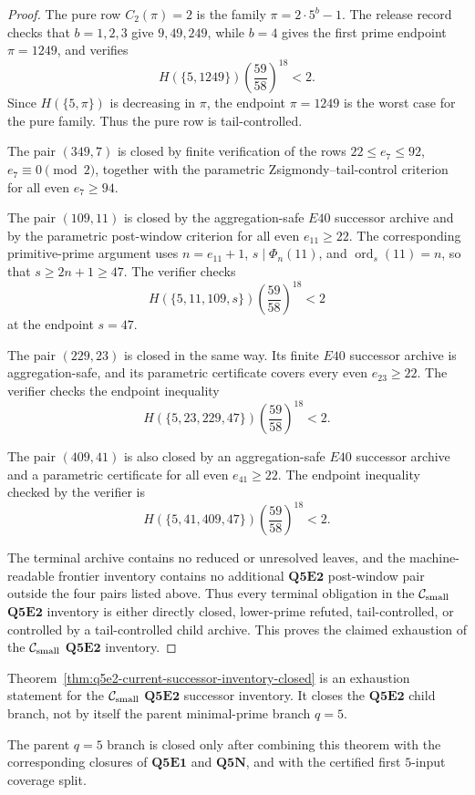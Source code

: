 \begin{proof}
The pure row \(C_2(\pi)=2\) is the family \(\pi=2\cdot5^b-1\).  The release
record checks that \(b=1,2,3\) give \(9,49,249\), while \(b=4\) gives the first
prime endpoint \(\pi=1249\), and verifies
\[
  H(\{5,1249\})
  \left(\frac{59}{58}\right)^{18}<2.
\]
Since \(H(\{5,\pi\})\) is decreasing in \(\pi\), the endpoint \(\pi=1249\) is
the worst case for the pure family.
Thus the pure row is tail-controlled.

The pair \((349,7)\) is closed by finite verification of the rows
\(22\le e_7\le92\), \(e_7\equiv0\pmod2\), together with the parametric
Zsigmondy--tail-control criterion for all even \(e_7\ge94\).

The pair \((109,11)\) is closed by the aggregation-safe \(E40\) successor
archive and by the parametric post-window criterion for all even
\(e_{11}\ge22\).  The corresponding primitive-prime argument uses
\(n=e_{11}+1\), \(s\mid\Phi_n(11)\), and \(\operatorname{ord}_s(11)=n\), so
that \(s\ge2n+1\ge47\).
The verifier checks
\[
  H(\{5,11,109,s\})
  \left(\frac{59}{58}\right)^{18}<2
\]
at the endpoint \(s=47\).

The pair \((229,23)\) is closed in the same way.  Its finite \(E40\) successor
archive is aggregation-safe, and its parametric certificate covers every even
\(e_{23}\ge22\).
The verifier checks the endpoint inequality
\[
  H(\{5,23,229,47\})
  \left(\frac{59}{58}\right)^{18}<2.
\]

The pair \((409,41)\) is also closed by an aggregation-safe \(E40\) successor
archive and a parametric certificate for all even \(e_{41}\ge22\).
The endpoint inequality checked by the verifier is
\[
  H(\{5,41,409,47\})
  \left(\frac{59}{58}\right)^{18}<2.
\]

The terminal archive contains no reduced or unresolved leaves, and the
machine-readable frontier inventory contains no additional \(\mathbf{Q5E2}\)
post-window pair outside the four pairs listed above.  Thus every terminal
obligation in the \(\mathcal C_{\mathrm{small}}\) \(\mathbf{Q5E2}\) inventory is either
directly closed, lower-prime refuted, tail-controlled, or controlled by a
tail-controlled child archive.  This proves the claimed exhaustion of the
\(\mathcal C_{\mathrm{small}}\) \(\mathbf{Q5E2}\) inventory.
\end{proof}

\begin{remark}
\label{rem:scope-q5e2-current-successor-inventory-closed}
Theorem~\ref{thm:q5e2-current-successor-inventory-closed} is an exhaustion
statement for the \(\mathcal C_{\mathrm{small}}\) \(\mathbf{Q5E2}\) successor inventory.  It
closes the \(\mathbf{Q5E2}\) child branch, not by itself the parent
minimal-prime branch \(q=5\).

The parent \(q=5\) branch is closed only after combining this theorem with the
corresponding closures of \(\mathbf{Q5E1}\) and \(\mathbf{Q5N}\), and with the
certified first \(5\)-input coverage split.
\end{remark}

